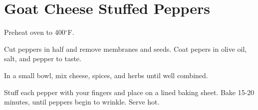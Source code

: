 \section{Goat Cheese Stuffed Peppers}
\begin{recipe}
	
	
	
	Preheat oven to 400$^{\circ}$F. 
	
	Cut peppers in half and remove membranes and seeds. Coat pepers in olive oil, salt, and pepper to taste.
	
	In a small bowl, mix cheese, spices, and herbs until well combined.
	
	Stuff each pepper with your fingers and place on a lined baking sheet. Bake 15-20 minutes, until peppers begin to wrinkle. Serve hot.
	
\end{recipe}
